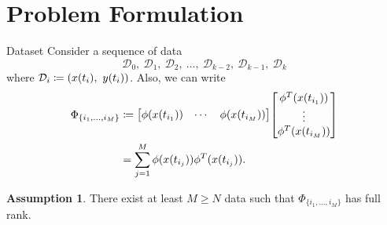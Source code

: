 \documentclass[]{beamer}
\theoremstyle{plain}
\theoremstyle{definition}
\newtheorem{assumption}{Assumption}
\theoremstyle{remark}
\newcommand{\MC}[1]{\mathcal{#1}}
\begin{document}
\section{Problem Formulation}

\begin{frame}{Dataset}
	Consider a sequence of data
	\begin{equation*}
		\MC{D}_0,\ \MC{D}_1,\ \MC{D}_2,\ \dotsc,\ \MC{D}_{k-2},\
		\MC{D}_{k-1},\ \MC{D}_k
	\end{equation*}
	where $\MC{D}_i \coloneqq \qty(x(t_i),\ y(t_i))$. Also, we can write
	\begin{align*}
		\Phi_{\{i_1,\dotsc,i_M\}}
		&\coloneqq \mqty[\phi(x(t_{i_1})) & \cdots & \phi(x(t_{i_M}))]
		\mqty[\phi^T(x(t_{i_1})) \\ \vdots \\ \phi^T(x(t_{i_M}))] \\
		&= \sum_{j=1}^M \phi(x(t_{i_j})) \phi^T(x(t_{i_j})).
	\end{align*}

	\begin{assumption}
		There exist at least $M \ge N$ data such that $\Phi_{\{i_1,\dotsc,i_M\}}$
		has full rank.
	\end{assumption}
\end{frame}
\end{document}
